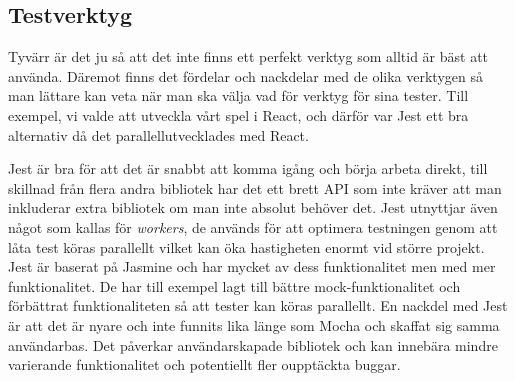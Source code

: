 \subsection{Testverktyg}
Tyvärr är det ju så att det inte finns ett perfekt verktyg som alltid är bäst att använda. Däremot finns det fördelar och nackdelar med de olika verktygen så man lättare kan veta när man ska välja vad för verktyg för sina tester. Till exempel, vi valde att utveckla vårt spel i React, och därför var Jest ett bra alternativ då det parallellutvecklades med React. 

Jest är bra för att det är snabbt att komma igång och börja arbeta direkt, till skillnad från flera andra bibliotek har det ett brett API som inte kräver att man inkluderar extra bibliotek om man inte absolut behöver det. Jest utnyttjar även något som kallas för \textit{workers}, de används för att optimera testningen genom att låta test köras parallellt vilket kan öka hastigheten enormt vid större projekt. Jest är baserat på Jasmine och har mycket av dess funktionalitet men med mer funktionalitet. De har till exempel lagt till bättre mock-funktionalitet och förbättrat funktionaliteten så att tester kan köras parallellt. En nackdel med Jest är att det är nyare och inte funnits lika länge som Mocha och skaffat sig samma användarbas. Det påverkar användarskapade bibliotek och kan innebära mindre varierande funktionalitet och potentiellt fler oupptäckta buggar.